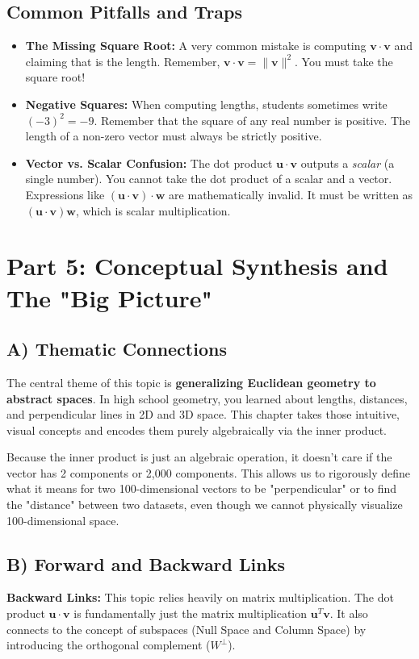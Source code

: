 \documentclass[11pt, letterpaper]{article}
\theoremstyle{definition}
\theoremstyle{remark}
\begin{document}
\subsection{Common Pitfalls and Traps}
\begin{itemize}
    \item \textbf{The Missing Square Root:} A very common mistake is computing $\mathbf{v} \cdot \mathbf{v}$ and claiming that is the length. Remember, $\mathbf{v} \cdot \mathbf{v} = \|\mathbf{v}\|^2$. You must take the square root!
    \item \textbf{Negative Squares:} When computing lengths, students sometimes write $(-3)^2 = -9$. Remember that the square of any real number is positive. The length of a non-zero vector must always be strictly positive.
    \item \textbf{Vector vs. Scalar Confusion:} The dot product $\mathbf{u} \cdot \mathbf{v}$ outputs a \textit{scalar} (a single number). You cannot take the dot product of a scalar and a vector. Expressions like $(\mathbf{u} \cdot \mathbf{v}) \cdot \mathbf{w}$ are mathematically invalid. It must be written as $(\mathbf{u} \cdot \mathbf{v})\mathbf{w}$, which is scalar multiplication.
\end{itemize}

\newpage
\section{Part 5: Conceptual Synthesis and The "Big Picture"}

\subsection{A) Thematic Connections}
The central theme of this topic is \textbf{generalizing Euclidean geometry to abstract spaces}. In high school geometry, you learned about lengths, distances, and perpendicular lines in 2D and 3D space. This chapter takes those intuitive, visual concepts and encodes them purely algebraically via the inner product. 

Because the inner product is just an algebraic operation, it doesn't care if the vector has 2 components or 2,000 components. This allows us to rigorously define what it means for two 100-dimensional vectors to be "perpendicular" or to find the "distance" between two datasets, even though we cannot physically visualize 100-dimensional space.

\subsection{B) Forward and Backward Links}
\textbf{Backward Links:} This topic relies heavily on matrix multiplication. The dot product $\mathbf{u} \cdot \mathbf{v}$ is fundamentally just the matrix multiplication $\mathbf{u}^T \mathbf{v}$. It also connects to the concept of subspaces (Null Space and Column Space) by introducing the orthogonal complement ($W^\perp$).
\end{document}
